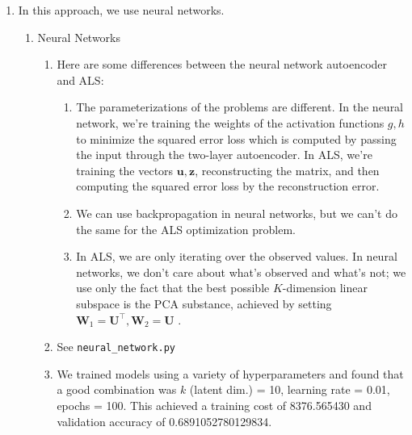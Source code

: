 \documentclass{article}
\newcommand{\mbf}[1]{\mathbf{#1}}
\begin{document}
\begin{enumerate}[label=\arabic*.]
    \item In this approach, we use neural networks. %
        \begin{enumerate}[label=(\roman*)]
            \addtocounter{enumii}{1}
            \item Neural Networks
                \begin{enumerate}[label=(\alph*)]
                    \item Here are some differences between the neural network autoencoder and ALS:
                        \begin{enumerate}
                            \item The parameterizations of the problems are different. In the neural network, we're training the weights of the activation functions $g, h$ to minimize the squared error loss which is computed by passing the input through the two-layer autoencoder. In ALS, we're training the vectors $\mbf u,\mbf z$, reconstructing the matrix, and then computing the squared error loss by the reconstruction error.
                            \item We can use backpropagation in neural networks, but we can't do the same for the ALS optimization problem.
                            \item In ALS, we are only iterating over the observed values. In neural networks, we don't care about what's observed and what's not; we use only the fact that the best possible $K$-dimension linear subspace is the PCA substance, achieved by setting $\mbf W_1=\mbf U^\top,\mbf W_2=\mbf U$ \cite{pcaapplications}.
                        \end{enumerate}
                    \item See \texttt{neural\_network.py}
                    \item We trained models using a variety of hyperparameters and found that a good combination was $k$ (latent dim.) = 10, learning rate = 0.01, epochs = 100. This achieved a training cost of 8376.565430	 and validation accuracy of 0.6891052780129834.

\end{enumerate}
\end{enumerate}
\end{enumerate}
\end{document}
